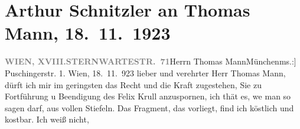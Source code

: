 

         
         \newcommand{\erwaehntePersonen}{Personen: Thomas Mann, Katia Mann, Heinrich Schnitzler, Lili Schnitzler}
         \newcommand{\erwaehnteOrte}{Orte: München, Poschingerstraße, Sternwartestraße, Wien, XVIII., Währing}
         \newcommand{\erwaehnteWerke}{Werke: Bekenntnisse des Hochstaplers Felix Krull}
               \section[Arthur Schnitzler an Thomas Mann, 18. 11. 1923]{ Arthur Schnitzler an Thomas Mann, 18. 11. 1923}\nopagebreak{}\rehead{ }\begin{ledgroupsized}[t]{13cm}\normalsize\beginnumbering \toendnotes[C]{\smallbreak\pagebreak[2]} 
\toendnotes[C]{\smallbreak}\pstart{}{\pb}\label{T_L02404-1v}\label{T_L02404-1h}\pend{}\pstart{}\textcolor{gray}{\textbf{WIEN, XVIII.}}\pend{}\pstart{}\textcolor{gray}{\textbf{STERNWARTESTR. 71}}\pend{}{\bigskip}\pstart{}{\pb}Herrn Thomas Mann\pend{}\pstart{}München\pend{}\pstart{}\strikeout{Puch}{ }{[}ms.:{]} Puschingerstr. 1. \pend{}{\bigskip}\pstart
           \raggedleft{}{\pb}Wien, 18. 11. 923\pend
           \pstart{}lieber und verehrter Herr Thomas Mann,\pend\pstart
           dürft ich mir im geringsten das Recht und die Kraft zugestehen, Sie zu
                    Fortführung u Beendigung des Felix Krull
                    anzuspornen, ich thät es, we{\geminationn} man so sagen darf,
                    aus vollen Stiefeln. Das Fragment, das vorliegt, find ich köstlich und kostbar. Ich weiß nicht,

\end{ledgroupsized}
